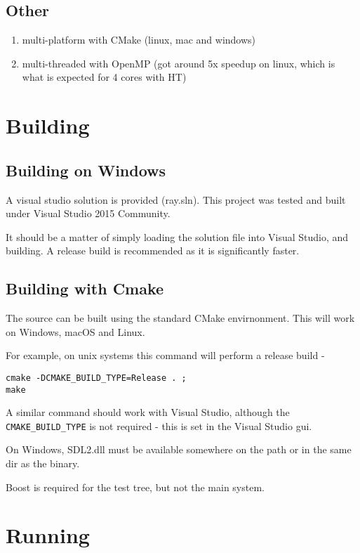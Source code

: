 \subsection{Other}
    \begin{enumerate}
    \item multi-platform with CMake (linux, mac and windows)
    \item multi-threaded with OpenMP (got around 5x speedup on linux, which is what is expected for 4 cores with HT)
    \end{enumerate}

\section{Building}

\subsection{Building on Windows}
A visual studio solution is provided (ray.sln). This project was tested and built under Visual Studio 2015 Community. 

It should be a matter of simply loading the solution file into Visual Studio, and building. A release build is recommended as it is significantly faster.

\subsection{Building with Cmake}
The source can be built using the standard CMake envirnonment. This will work on Windows, macOS and Linux. 

For example, on unix systems this command will perform a release build -

\verb|cmake -DCMAKE_BUILD_TYPE=Release . ;| \\
\verb|make|

A similar command should work with Visual Studio, although the \verb|CMAKE_BUILD_TYPE| is not required - this is set in the Visual Studio gui.

On Windows, SDL2.dll must be available somewhere on the path or in the same dir as the binary. 

Boost is required for the test tree, but not the main system.

\section{Running}

